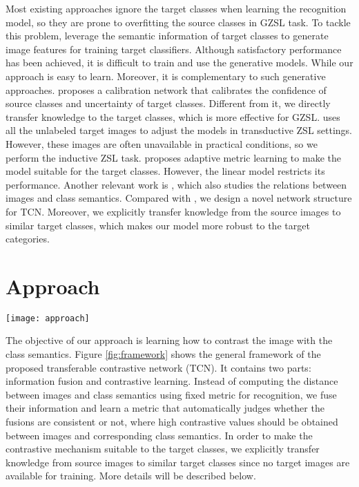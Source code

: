\documentclass[10pt,twocolumn,letterpaper]{article}
\begin{document}
Most existing approaches ignore the target classes when learning the recognition model, so they are prone to overfitting the source classes in GZSL task. To tackle this problem, \cite{xian2018feature,Zhu2018AGA} leverage the semantic information of target classes to generate image features for training target classifiers. Although satisfactory performance has been achieved, it is difficult to train and use the generative models. While our approach is easy to learn. Moreover, it is complementary to such generative approaches. \cite{Liu2018GeneralizedZL} proposes a calibration network that calibrates the confidence of source classes and uncertainty of target classes. Different from it, we directly transfer knowledge to the target classes, which is more effective for GZSL. \cite{Fu2015TransductiveMZ} uses all the unlabeled target images to adjust the models in transductive ZSL settings. However, these images are often unavailable in practical conditions, so we perform the inductive ZSL task. \cite{Jiang2019AML} proposes adaptive metric learning to make the model suitable for the target classes. However, the linear model restricts its performance. Another relevant work is \cite{sung2018learning}, which also studies the relations between images and class semantics. Compared with \cite{sung2018learning}, we design a novel network structure for TCN. Moreover, we explicitly transfer knowledge from the source images to similar target classes, which makes our model more robust to the target categories.

\section{Approach}

\begin{figure*}[t]
\centering
\texttt{[image: approach]}
\caption{The framework of transferable contrastive network. The information fusion module merges the image information with the class semantic information. The contrastive learning module automatically judges whether the fusion is consistent or not. `' denotes the element-wise product operation.}
\label{fig:framework}
\end{figure*}

The objective of our approach is learning how to contrast the image with the class semantics. Figure \ref{fig:framework} shows the general framework of the proposed transferable contrastive network (TCN). It contains two parts: information fusion and contrastive learning. Instead of computing the distance between images and class semantics using fixed metric for recognition, we fuse their information and learn a metric that automatically judges whether the fusions are consistent or not, where high contrastive values should be obtained between images and corresponding class semantics. In order to make the contrastive mechanism suitable to the target classes, we explicitly transfer knowledge from source images to similar target classes since no target images are available for training. More details will be described below.
\end{document}
